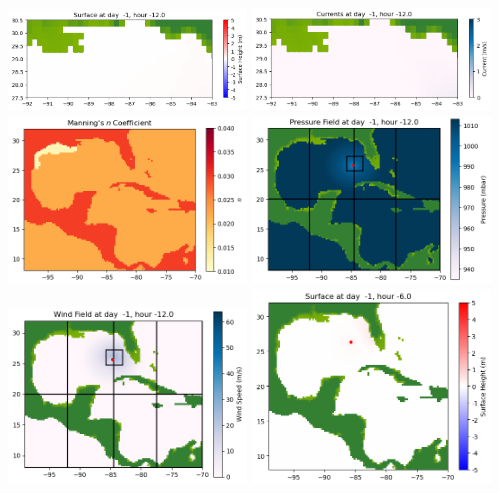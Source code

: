 \documentclass[11pt]{article}
\begin{document}
\vskip 10pt 
\includegraphics[width=0.475\textwidth]{frame0002fig1003.png}
\includegraphics[width=0.475\textwidth]{frame0002fig1004.png}
\vskip 10pt 
\includegraphics[width=0.475\textwidth]{frame0002fig1005.png}
\includegraphics[width=0.475\textwidth]{frame0002fig1006.png}
\vskip 10pt 
\includegraphics[width=0.475\textwidth]{frame0002fig1007.png}
\vskip 10pt 
\includegraphics[width=0.475\textwidth]{frame0003fig1001.png}
\end{document}
